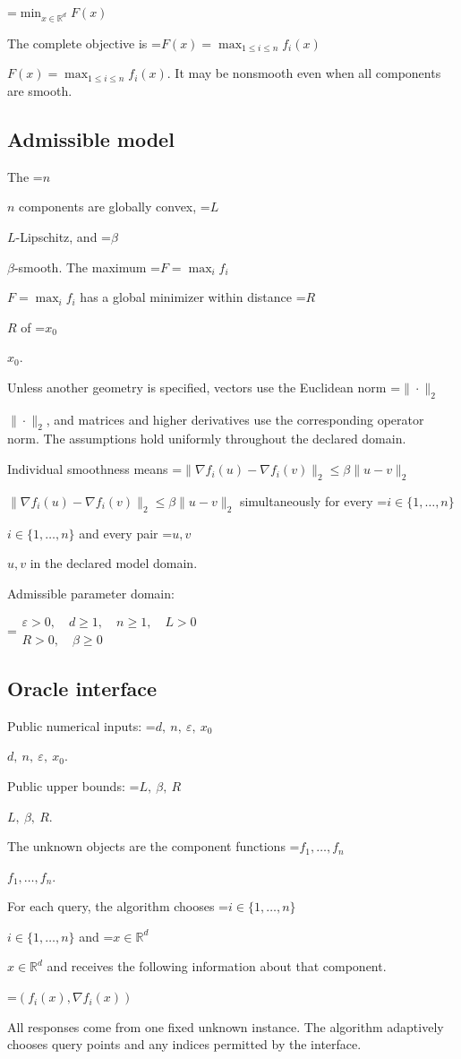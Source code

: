 \documentclass[10pt,a4paper]{article}
\newcommand{\AtlasMath}[1]{\par\begingroup\centering\setbox0=\hbox{$\displaystyle #1$}\ifdim\wd0>1.4\linewidth\typeout{ATLAS WIDE FORMULA: \the\wd0}\fi\ifdim\wd0>\linewidth\resizebox{\linewidth}{!}{\box0}\else\box0\fi\par\endgroup}
\newcommand{\AtlasInlineMath}[1]{\begingroup\setbox0=\hbox{$#1$}\ifdim\wd0>.4\linewidth\endgroup\AtlasMath{#1}\else\endgroup$#1$\fi}
\begin{document}
\AtlasMath{\min_{x\in \mathbb{R}^d}F(x)}


The complete objective is \AtlasInlineMath{F(x)=\max_{1\le i\le n}f_i(x)}. It may be nonsmooth even when all components are smooth.

\subsection{Admissible model}
The \AtlasInlineMath{n} components are globally convex, \AtlasInlineMath{L}-Lipschitz, and \AtlasInlineMath{\beta}-smooth. The maximum \AtlasInlineMath{F=\max_i f_i} has a global minimizer within distance \AtlasInlineMath{R} of \AtlasInlineMath{x_0}.

Unless another geometry is specified, vectors use the Euclidean norm \AtlasInlineMath{\|\cdot\|_2}, and matrices and higher derivatives use the corresponding operator norm. The assumptions hold uniformly throughout the declared domain.

Individual smoothness means \AtlasInlineMath{\|\nabla f_i(u)-\nabla f_i(v)\|_2\le\beta\|u-v\|_2} simultaneously for every \AtlasInlineMath{i\in\{1,\ldots,n\}} and every pair \AtlasInlineMath{u,v} in the declared model domain.

Admissible parameter domain:


\AtlasMath{\begin{gathered}\varepsilon > 0,\quad d \ge 1,\quad n \ge 1,\quad L > 0\\R > 0,\quad \beta \ge 0\end{gathered}}


\subsection{Oracle interface}
Public numerical inputs: \AtlasInlineMath{d,\ n,\ \varepsilon,\ x_0}.

Public upper bounds: \AtlasInlineMath{L,\ \beta,\ R}.

The unknown objects are the component functions \AtlasInlineMath{f_1,\ldots,f_n}.

For each query, the algorithm chooses \AtlasInlineMath{i\in\{1,\ldots,n\}} and \AtlasInlineMath{x\in\mathbb R^d} and receives the following information about that component.


\AtlasMath{(f_i(x),\nabla f_i(x))}


All responses come from one fixed unknown instance. The algorithm adaptively chooses query points and any indices permitted by the interface.
\end{document}
